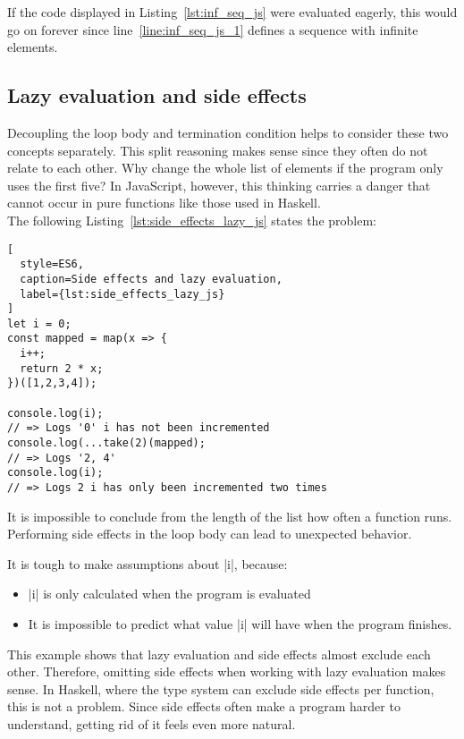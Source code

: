 If the code displayed in Listing~\ref{lst:inf_seq_js} were evaluated eagerly,
this would go on forever since line~\ref{line:inf_seq_js_1} defines a sequence
with infinite elements. \\ 

\subsection{Lazy evaluation and side effects} %
\label{sub:Lazy Evaluation and Side Effects}
Decoupling the loop body and termination condition helps to consider these two
concepts separately. This split reasoning makes sense since they often do not
relate to each other. Why change the whole list of elements if the program only
uses the first five? In JavaScript, however, this thinking carries a danger
that cannot occur in pure functions like those used in Haskell. \\ 
The following Listing~\ref{lst:side_effects_lazy_js} states the problem:

\begin{lstlisting}[
  style=ES6,
  caption=Side effects and lazy evaluation,
  label={lst:side_effects_lazy_js}
]
let i = 0;
const mapped = map(x => {
  i++;
  return 2 * x;
})([1,2,3,4]);

console.log(i);
// => Logs '0' i has not been incremented
console.log(...take(2)(mapped);
// => Logs '2, 4' 
console.log(i);
// => Logs 2 i has only been incremented two times
\end{lstlisting}

It is impossible to conclude from the length of the list how often a function
runs. Performing side effects in the loop body can lead to unexpected behavior. 

It is tough to make assumptions about |i|, because:
\begin{itemize}
  \item |i| is only calculated when the program is evaluated
  \item It is impossible to predict what value |i| will have when the program
    finishes.
\end{itemize}
This example shows that lazy evaluation and side effects almost exclude each
other. Therefore, omitting side effects when working with lazy evaluation makes
sense. In Haskell, where the type system can exclude side effects per function,
this is not a problem. Since side effects often make a program harder to
understand, getting rid of it feels even more natural.

